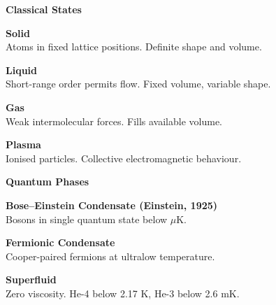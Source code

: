 \newpage
\thispagestyle{empty}

\begin{center}
\begin{tcolorbox}[
  enhanced,
  breakable,
  width=\textwidth,
  colframe=blue!60!black,
  colback=blue!5,
  colbacktitle=blue!60!black,
  coltitle=white,
  boxrule=0.5pt,
  arc=2mm,
  left=12pt,
  right=12pt,
  top=12pt,
  bottom=12pt,
  title=Phases of Matter,
  fonttitle=\bfseries\large,
  attach boxed title to top left={yshift=-2mm, xshift=5mm},
  boxed title style={arc=1mm, boxrule=0.5pt}
]

\begin{multicols}{2}
\raggedright
\small

\colorbox{blue!15}{\textbf{ Classical States}}\vspace{2pt}

\textbf{Solid}\\
{\footnotesize Atoms in fixed lattice positions. Definite shape and volume.}\vspace{4pt}

\textbf{Liquid}\\
{\footnotesize Short-range order permits flow. Fixed volume, variable shape.}\vspace{4pt}

\textbf{Gas}\\
{\footnotesize Weak intermolecular forces. Fills available volume.}\vspace{4pt}

\textbf{Plasma}\\
{\footnotesize Ionised particles. Collective electromagnetic behaviour.}\vspace{8pt}

\colorbox{blue!15}{\textbf{ Quantum Phases}}\vspace{2pt}

\textbf{Bose–Einstein Condensate (Einstein, 1925)}\\
{\footnotesize Bosons in single quantum state below $\mu$K.}\vspace{4pt}

\textbf{Fermionic Condensate}\\
{\footnotesize Cooper-paired fermions at ultralow temperature.}\vspace{4pt}

\textbf{Superfluid}\\
{\footnotesize Zero viscosity. He-4 below 2.17 K, He-3 below 2.6 mK.}\vspace{4pt}


\end{multicols}
\end{tcolorbox}
\end{center}
